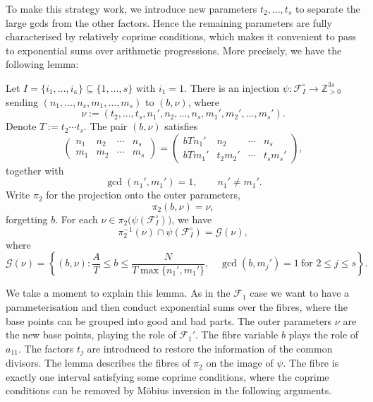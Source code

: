 To make this strategy work, we introduce new parameters $t_2,\dots ,t_s$
to separate the large gcds from the other factors. Hence the remaining
parameters are fully characterised by relatively coprime conditions, which makes it convenient to pass to exponential sums over arithmetic progressions.
More precisely, we have the following lemma:
\begin{lemma}\label{lem:intersection-param}
Let $I=\{i_1,\ldots,i_\kappa\}\subseteq\{1,\ldots,s\}$ with $i_1=1$.
There is an injection
$\psi\colon\mathscr{F}_I^\circ\to\mathbb{Z}_{>0}^{3s}$ sending
$(n_1,\ldots,n_s,m_1,\ldots,m_s)$ to $(b,\nu)$, where
\[
\nu:=(t_2,\ldots,t_s,n_1',n_2,\ldots,n_s,m_1',m_2',\ldots,m_s').
\]
Denote $T:=t_2\cdots t_s$. The pair $(b,\nu)$ satisfies
\[
\begin{pmatrix}
n_1 & n_2 & \cdots & n_s \\
m_1 & m_2 & \cdots & m_s
\end{pmatrix}
=
\begin{pmatrix}
b T n_1' & n_2 & \cdots & n_s \\
b T m_1' & t_2 m_2' & \cdots & t_s m_s'
\end{pmatrix},
\]
together with
\[
\gcd(n_1',m_1')=1,\qquad
n_1'\neq m_1'.
\]
Write $\pi_2$ for the projection onto the outer parameters,
\[
\pi_2(b,\nu)=\nu,
\]
forgetting $b$.
For each $\nu\in\pi_2\bigl(\psi(\mathscr{F}_I^\circ)\bigr)$, we have
\[
\pi_2^{-1}(\nu)\cap\psi(\mathscr{F}_I^\circ)
=\mathscr G(\nu),
\]
where
\[
\mathscr G(\nu)
=\left\{(b,\nu):
\frac{A}{T}\leq b\leq
\frac{N}{T\max\{n_1',m_1'\}},\quad
\gcd(b,m_j')=1\ \text{for }2\leq j\leq s
\right\}.
\]
\end{lemma}
We take a moment to explain this lemma.
As in the $\mathscr{F}_1$ case we want to have a parameterisation
and then conduct exponential sums over the fibres, where the base points
can be grouped into good and bad parts.
The outer parameters \(\nu\) are the new base points, playing the role of \(\mathscr{F}_1'\).
The fibre variable \(b\) plays the role of \(a_{11}\).
The factors \(t_j\) are introduced to restore the information of the common divisors.
The lemma describes the fibres of $\pi_2$ on the image of $\psi$.
The fibre is exactly one interval satisfying some coprime conditions, where
the coprime conditions can be removed by M\"obius inversion in the following arguments.



